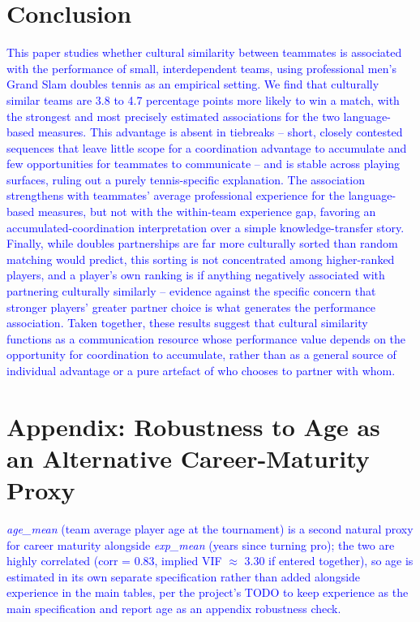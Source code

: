 \documentclass[10pt]{article}
\begin{document}
\section{Conclusion}
\textcolor{blue}{This paper studies whether cultural similarity between teammates is associated with the performance of small, interdependent teams, using professional men's Grand Slam doubles tennis as an empirical setting. We find that culturally similar teams are 3.8 to 4.7 percentage points more likely to win a match, with the strongest and most precisely estimated associations for the two language-based measures. This advantage is absent in tiebreaks -- short, closely contested sequences that leave little scope for a coordination advantage to accumulate and few opportunities for teammates to communicate -- and is stable across playing surfaces, ruling out a purely tennis-specific explanation. The association strengthens with teammates' average professional experience for the language-based measures, but not with the within-team experience gap, favoring an accumulated-coordination interpretation over a simple knowledge-transfer story. Finally, while doubles partnerships are far more culturally sorted than random matching would predict, this sorting is not concentrated among higher-ranked players, and a player's own ranking is if anything negatively associated with partnering culturally similarly -- evidence against the specific concern that stronger players' greater partner choice is what generates the performance association. Taken together, these results suggest that cultural similarity functions as a communication resource whose performance value depends on the opportunity for coordination to accumulate, rather than as a general source of individual advantage or a pure artefact of who chooses to partner with whom.}

\appendix
\renewcommand{\thetable}{A\arabic{table}}
\setcounter{table}{0}
\section{Appendix: Robustness to Age as an Alternative Career-Maturity Proxy}
\textcolor{blue}{\textit{age\_mean} (team average player age at the tournament) is a second natural proxy for career maturity alongside \textit{exp\_mean} (years since turning pro); the two are highly correlated (corr = 0.83, implied VIF $\approx$ 3.30 if entered together), so age is estimated in its own separate specification rather than added alongside experience in the main tables, per the project's TODO to keep experience as the main specification and report age as an appendix robustness check.}
\end{document}
